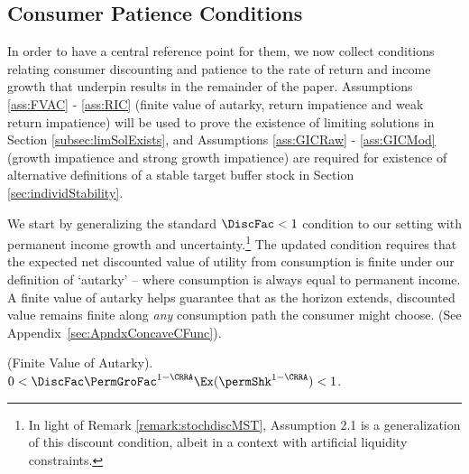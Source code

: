 \documentclass[\econtexRoot/BufferStockTheory]{subfiles}
\begin{document}
\hypertarget{GICTheorySetup}{}
\hypertarget{Uncertainty-Modified-Conditions}{}
\subsection{Consumer Patience Conditions}\label{subsec:GICTheorySetup}

In order to have a central reference point for them, we now collect conditions relating consumer discounting and patience to the rate of return and income growth that underpin results in the remainder of the paper.
Assumptions \ref{ass:FVAC} - \ref{ass:RIC}  (finite value of autarky, return impatience and weak return impatience) will be used to prove the existence of limiting solutions in Section \ref{subsec:limSolExists}, and Assumptions \ref{ass:GICRaw} - \ref{ass:GICMod} (growth impatience and strong growth impatience) are required for existence of alternative definitions of a stable target buffer stock in Section \ref{sec:individStability}.


We start by generalizing the standard $\DiscFac<1$ condition to our setting with permanent income growth and uncertainty.\footnote{In light of Remark \ref{remark:stochdiscMST}, \cite{mstIncFluct} Assumption 2.1 is a generalization of this discount condition, albeit in a context with artificial liquidity constraints.} The updated condition requires that the expected net discounted value of utility from consumption is finite under our definition of `autarky' -- where consumption is always equal to permanent income.
A finite value of autarky helps guarantee that as the horizon extends, discounted value remains finite along \textit{any} consumption path the consumer might choose.
(See Appendix~\ref{sec:ApndxConcaveCFunc}).



\hypertarget{FVAC}{}
\begin{assumL}\label{ass:FVAC}(Finite Value of Autarky). 
%
$0 < \DiscFac \PermGroFac^{1-\CRRA}\Ex(\permShk^{1-\CRRA}) < 1 $.
%
\end{assumL}
\end{document}
